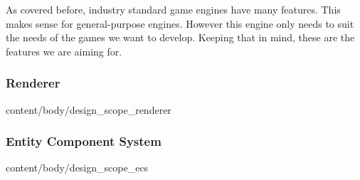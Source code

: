 As covered before,
industry standard game engines have many features.
This makes sense for general-purpose engines.
However this engine only needs to suit the needs of the games we want to develop.
Keeping that in mind,
these are the features we are aiming for.

\subsubsection{Renderer}{content/body/design_scope_renderer}
\subsubsection{Entity Component System}{content/body/design_scope_ecs}
